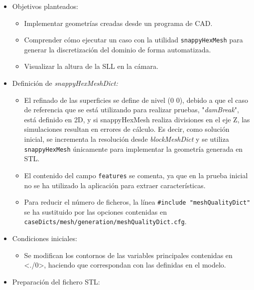 \begin{itemize}
\item
  Objetivos planteados:

  \begin{itemize}
  \item
    Implementar geometrías creadas desde un programa de CAD.
  \item
    Comprender cómo ejecutar un caso con la utilidad
    \texttt{snappyHexMesh} para generar la discretización del dominio de
    forma automatizada.
  \item
    Visualizar la altura de la SLL en la cámara.
  \end{itemize}
\item
  Definición de \emph{snappyHexMeshDict:}

  \begin{itemize}
  \item
    El refinado de las superficies se define de nivel (0 0), debido a
    que el caso de referencia que se está utilizando para realizar
    pruebas, "\emph{damBreak}", está definido en 2D, y si snappyHexMesh
    realiza divisiones en el eje Z, las simulaciones resultan en errores
    de cálculo. Es decir, como solución inicial, se incrementa la
    resolución desde \emph{blockMeshDict} y se utiliza
    \texttt{snappyHexMesh} únicamente para implementar la geometría
    generada en STL.
  \item
    El contenido del campo \texttt{features} se comenta, ya que en la
    prueba inicial no se ha utilizado la aplicación para extraer
    características.
  \item
    Para reducir el número de ficheros, la línea
    \texttt{\#include\ "meshQualityDict"} se ha sustituido por las
    opciones contenidas en
    \texttt{caseDicts/mesh/generation/meshQualityDict.cfg}.
  \end{itemize}
\item
  Condiciones iniciales:

  \begin{itemize}
  \item
    Se modifican los contornos de las variables principales contenidas
    en \textless{}./0\textgreater{}, haciendo que correspondan con las
    definidas en el modelo.
  \end{itemize}
\item
  Preparación del fichero STL:


\end{itemize}
